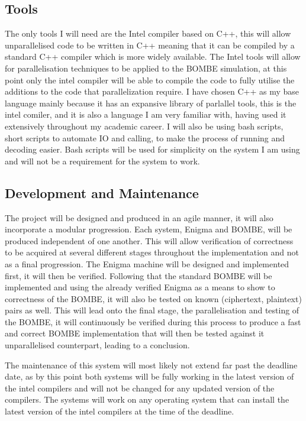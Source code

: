 \documentclass[12pt,a4paper]{article}
\begin{document}
\subsection{Tools}

The only tools I will need are the Intel compiler based on C++, this will allow unparallelised code to be written in C++ meaning that it can be compiled by a standard C++ compiler which is more widely available. The Intel tools will allow for parallelisation techniques to be applied to the BOMBE simulation, at this point only the intel compiler will be able to compile the code to fully utilise the additions to the code that parallelization require. I have chosen C++ as my base language mainly because it has an expansive library of parlallel tools, this is the intel comiler, and it is also a language I am very familiar with, having used it extensively throughout my academic career. I will also be using bash scripts, short scripts to automate IO and calling, to make the process of running and decoding easier. Bash scripts will be used for simplicity on the system I am using and will not be a requirement for the system to work.

\subsection{Development and Maintenance}

The project will be designed and produced in an agile manner, it will also incorporate a modular progression. Each system, Enigma and BOMBE, will be produced independent of one another. This will allow verification of correctness to be acquired at several different stages throughout the implementation and not as a final progression. The Enigma machine will be designed and implemented first, it will then be verified. Following that the standard BOMBE will be implemented and using the already verified Enigma as a means to show to correctness of the BOMBE, it will also be tested on known (ciphertext, plaintext) pairs as well. This will lead onto the final stage, the parallelisation and testing of the BOMBE, it will continuously be verified during this process to produce a fast and correct BOMBE implementation that will then be tested against it unparallelised counterpart, leading to a conclusion.

The maintenance of this system will most likely not extend far past the deadline date, as by this point both systems will be fully working in the latest version of the intel compilers and will not be changed for any updated version of the compilers. The systems will work on any operating system that can install the latest version of the intel compilers at the time of the deadline.
\end{document}
